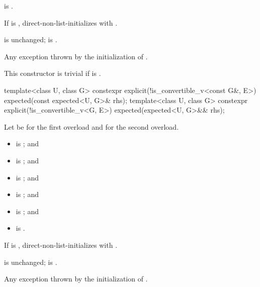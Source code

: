 \begin{itemdescr}
\pnum
\constraints
{} is .

\pnum
\effects
If  is ,
direct-non-list-initializes  with .

\pnum
\ensures
{} is unchanged;
 is .

\pnum
\throws
Any exception thrown by the initialization of .

\pnum
\remarks
This constructor is trivial
if  is .
\end{itemdescr}

%
\begin{itemdecl}
template<class U, class G>
  constexpr explicit(!is_convertible_v<const G&, E>) expected(const expected<U, G>& rhs);
template<class U, class G>
  constexpr explicit(!is_convertible_v<G, E>) expected(expected<U, G>&& rhs);
\end{itemdecl}

\begin{itemdescr}
\pnum
Let  be  for the first overload and
 for the second overload.

\pnum
\constraints
\begin{itemize}
\item
{} is ; and
\item
{} is ; and
\item
{}
is ; and
\item
{}
is ; and
\item
{}
is ; and
\item
{}
is .
\end{itemize}

\pnum
\effects
If  is ,
direct-non-list-initializes 
with .

\pnum
\ensures
{} is unchanged;
 is .

\pnum
\throws
Any exception thrown by the initialization of .
\end{itemdescr}

